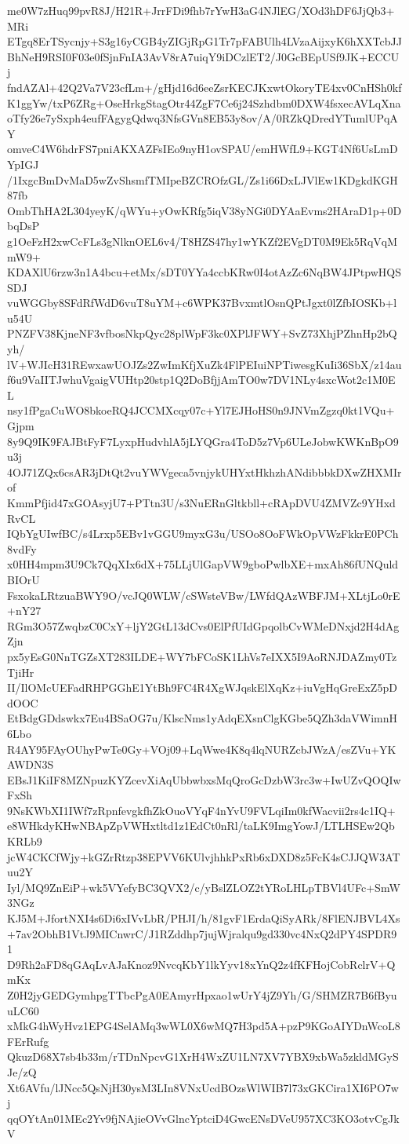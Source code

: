 me0W7zHuq99pvR8J/H21R+JrrFDi9fhb7rYwH3aG4NJlEG/XOd3hDF6JjQb3+MRi
ETgq8ErTSycnjy+S3g16yCGB4yZIGjRpG1Tr7pFABUlh4LVzaAijxyK6hXXTcbJJ
BhNeH9RSI0F03e0fSjnFnIA3AvV8rA7uiqY9iDCzlET2/J0GcBEpUSf9JK+ECCUj
fndAZAl+42Q2Va7V23cfLm+/gHjd16d6eeZsrKECJKxwtOkoryTE4xv0CnHSh0kf
K1ggYw/txP6ZRg+OseHrkgStagOtr44ZgF7Ce6j24Szhdbm0DXW4fsxecAVLqXna
oTfy26e7ySxph4eufFAgygQdwq3NfsGVn8EB53y8ov/A/0RZkQDredYTumlUPqAY
omveC4W6hdrFS7pniAKXAZFsIEo9nyH1ovSPAU/emHWfL9+KGT4Nf6UsLmDYpIGJ
/1IxgcBmDvMaD5wZvShsmfTMIpeBZCROfzGL/Zs1i66DxLJVlEw1KDgkdKGH87fb
OmbThHA2L304yeyK/qWYu+yOwKRfg5iqV38yNGi0DYAaEvms2HAraD1p+0DbqDsP
g1OeFzH2xwCcFLs3gNlknOEL6v4/T8HZS47hy1wYKZf2EVgDT0M9Ek5RqVqMmW9+
KDAXlU6rzw3n1A4bcu+etMx/sDT0YYa4ccbKRw0I4otAzZc6NqBW4JPtpwHQSSDJ
vuWGGby8SFdRfWdD6vuT8uYM+c6WPK37BvxmtlOsnQPtJgxt0lZfbIOSKb+lu54U
PNZFV38KjneNF3vfbosNkpQyc28plWpF3kc0XPlJFWY+SvZ73XhjPZhnHp2bQyh/
lV+WJIcH31REwxawUOJZs2ZwImKfjXuZk4FlPEIuiNPTiwesgKuIi36SbX/z14au
f6u9VaIITJwhuVgaigVUHtp20stp1Q2DoBfjjAmTO0w7DV1NLy4sxcWot2c1M0EL
nsy1fPgaCuWO8bkoeRQ4JCCMXcqy07c+Yl7EJHoHS0n9JNVmZgzq0kt1VQu+Gjpm
8y9Q9IK9FAJBtFyF7LyxpHudvhlA5jLYQGra4ToD5z7Vp6ULeJobwKWKnBpO9u3j
4OJ71ZQx6csAR3jDtQt2vuYWVgeca5vnjykUHYxtHkhzhANdibbbkDXwZHXMIrof
KmmPfjid47xGOAsyjU7+PTtn3U/s3NuERnGltkbll+cRApDVU4ZMVZc9YHxdRvCL
IQbYgUIwfBC/s4Lrxp5EBv1vGGU9myxG3u/USOo8OoFWkOpVWzFkkrE0PCh8vdFy
x0HH4mpm3U9Ck7QqXIx6dX+75LLjUlGapVW9gboPwlbXE+mxAh86fUNQuldBIOrU
FsxokaLRtzuaBWY9O/vcJQ0WLW/cSWsteVBw/LWfdQAzWBFJM+XLtjLo0rE+nY27
RGm3O57ZwqbzC0CxY+ljY2GtL13dCvs0ElPfUIdGpqolbCvWMeDNxjd2H4dAgZjn
px5yEsG0NnTGZsXT283ILDE+WY7bFCoSK1LhVs7eIXX5I9AoRNJDAZmy0TzTjiHr
II/IlOMcUEFadRHPGGhE1YtBh9FC4R4XgWJqskElXqKz+iuVgHqGreExZ5pDdOOC
EtBdgGDdswkx7Eu4BSaOG7u/KlscNms1yAdqEXsnClgKGbe5QZh3daVWimnH6Lbo
R4AY95FAyOUhyPwTe0Gy+VOj09+LqWwe4K8q4lqNURZcbJWzA/esZVu+YKAWDN3S
EBsJ1KiIF8MZNpuzKYZcevXiAqUbbwbxsMqQroGcDzbW3rc3w+IwUZvQOQIwFxSh
9NsKWbXI1IWf7zRpnfevgkfhZkOuoVYqF4nYvU9FVLqiIm0kfWacvii2rs4c1IQ+
e8WHkdyKHwNBApZpVWHxtltd1z1EdCt0nRl/taLK9ImgYowJ/LTLHSEw2QbKRLb9
jcW4CKCfWjy+kGZrRtzp38EPVV6KUlvjhhkPxRb6xDXD8z5FcK4sCJJQW3ATuu2Y
Iyl/MQ9ZnEiP+wk5VYefyBC3QVX2/c/yBslZLOZ2tYRoLHLpTBVl4UFc+SmW3NGz
KJ5M+JfortNXI4s6Di6xIVvLbR/PHJI/h/81gvF1ErdaQiSyARk/8FlENJBVL4Xs
+7av2ObhB1VtJ9MICnwrC/J1RZddhp7jujWjralqu9gd330vc4NxQ2dPY4SPDR91
D9Rh2aFD8qGAqLvAJaKnoz9NvcqKbY1lkYyv18xYnQ2z4fKFHojCobRclrV+QmKx
Z0H2jyGEDGymhpgTTbcPgA0EAmyrHpxao1wUrY4jZ9Yh/G/SHMZR7B6fByuuLC60
xMkG4hWyHvz1EPG4SelAMq3wWL0X6wMQ7H3pd5A+pzP9KGoAIYDnWcoL8FErRufg
QkuzD68X7sb4b33m/rTDnNpcvG1XrH4WxZU1LN7XV7YBX9xbWa5zkldMGySJe/zQ
Xt6AVfu/lJNcc5QsNjH30ysM3LIn8VNxUcdBOzsWlWIB7l73xGKCira1XI6PO7wj
qqOYtAn01MEc2Yv9fjNAjieOVvGlncYptciD4GwcENsDVeU957XC3KO3otvCgJkV
